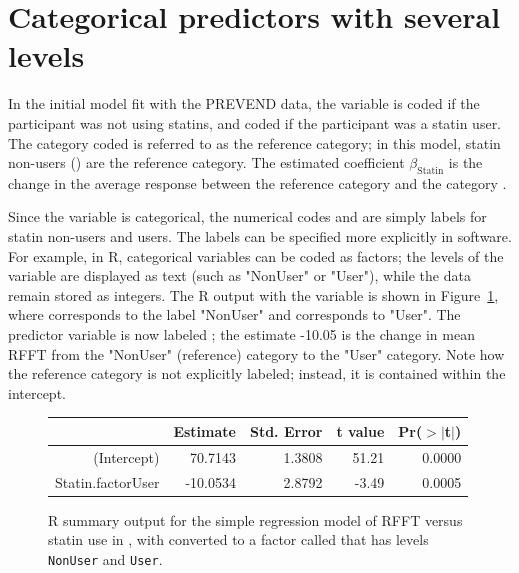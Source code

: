 \section{Categorical predictors with several levels}
\label{categoricalMoreThanTwoLevels}

In the initial model fit with the PREVEND data, the variable  is coded  if the participant was not using statins, and coded  if the participant was a statin user. The category coded  is referred to as the reference category; in this model, statin non-users () are the reference category. The estimated coefficient $\beta_{\text{Statin}}$ is the change in the average response between the reference category and the category .

Since the variable  is categorical, the numerical codes  and  are simply labels for statin non-users and users. The labels can be specified more explicitly in software. For example, in \textsf{R}, categorical variables can be coded as factors; the levels of the variable are displayed as text (such as "NonUser" or "User"), while the data remain stored as integers. The \textsf{R} output with the variable  is shown in Figure~\ref{prevendRFFTStatinFactorRegression}, where  corresponds to the label "NonUser" and  corresponds to "User". The predictor variable is now labeled ; the estimate -10.05 is the change in mean RFFT from the "NonUser" (reference) category to the "User" category. Note how the reference category is not explicitly labeled; instead, it is contained within the intercept. 

\begin{figure}[ht]
	\centering
	\begin{tabular}{rrrrr}
		\hline
		& Estimate & Std. Error & t value & Pr($>$$|$t$|$) \\ 
		\hline
		(Intercept) & 70.7143 & 1.3808 & 51.21 & 0.0000 \\ 
		 Statin.factorUser & -10.0534 & 2.8792 & -3.49 & 0.0005 \\ 
		\hline
	\end{tabular}
	\caption{\textsf{R} summary output for the simple regression model of RFFT versus statin use in , with  converted to a factor called  that has levels \texttt{NonUser} and \texttt{User}.} 
	\label{prevendRFFTStatinFactorRegression}
\end{figure}

